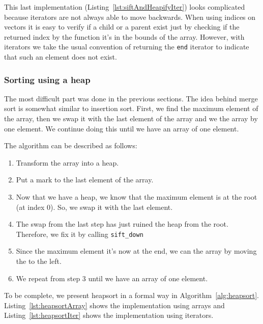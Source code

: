 
This last implementation (Listing~\ref{lst:siftAndHeapifyIter}) looks complicated because iterators are not always able to move backwards.
When using indices on vectors it is easy to verify if a child or a parent exist just by checking if the returned index by the function it's in the bounds of the array.
However, with iterators we take the usual convention of returning the \texttt{end} iterator to indicate that such an element does not exist.

\subsubsection{Sorting using a heap}

The most difficult part was done in the previous sections.
The idea behind merge sort is somewhat similar to insertion sort.
First, we find the maximum element of the array, then we swap it with the last element of the array and we  the array by one element.
We continue doing this until we have an array of one element.

The algorithm can be described as follows:
\begin{enumerate}
 \item Transform the array into a heap.
 \item Put a mark to the last element of the array.
 \item Now that we have a heap, we know that the maximum element is at the root (at index $0$). So, we swap it with the last element.
 \item The swap from the last step  has just ruined the heap from the root. Therefore, we fix it by calling \texttt{sift_down}
 \item Since the maximum element it's now at the end, we can  the array by moving the  to the left.
 \item We repeat from step 3 until we have an array of one element.
\end{enumerate}

To be complete, we present heapsort in a formal way in Algorithm~\ref{alg:heapsort}.
Listing~\ref{lst:heapsortArray} shows the implementation using arrays and Listing~\ref{lst:heapsortIter} shows the implementation using iterators.

